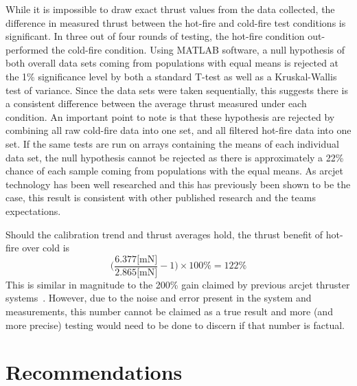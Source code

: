 \documentclass[journal]{IEEEtran}
\begin{document}
While it is impossible to draw exact thrust values from the data collected, the difference in measured thrust between the hot-fire and cold-fire test conditions is significant.
In three out of four rounds of testing, the hot-fire condition out-performed the cold-fire condition.
Using MATLAB software, a null hypothesis of both overall data sets coming from populations with equal means is rejected at the 1\% significance level by both a standard T-test as well as a Kruskal-Wallis test of variance.
Since the data sets were taken sequentially, this suggests there is a consistent difference between the average thrust measured under each condition.
An important point to note is that these hypothesis are rejected by combining all raw cold-fire data into one set, and all filtered hot-fire data into one set. If the same tests are run on arrays containing the means of each individual data set, the null hypothesis cannot be rejected as there is approximately a 22\% chance of each sample coming from populations with the equal means. 
As arcjet technology has been well researched and this has previously been shown to be the case, this result is consistent with other published research and the teams expectations.

Should the calibration trend and thrust averages hold, the thrust benefit of hot-fire over cold is
\begin{equation}
  \Bigg(\frac{6.377 \text{[mN]}}{2.865 \text{[mN]}} - 1\Bigg)\times100\% = 122\%
  \end{equation}
This is similar in magnitude to the 200\% gain claimed by previous arcjet thruster systems~\cite{sutton2010rocket}. However, due to the noise and error present in the system and measurements, this number cannot be claimed as a true result and more (and more precise) testing would need to be done to discern if that number is factual.

\section{Recommendations}
\end{document}
